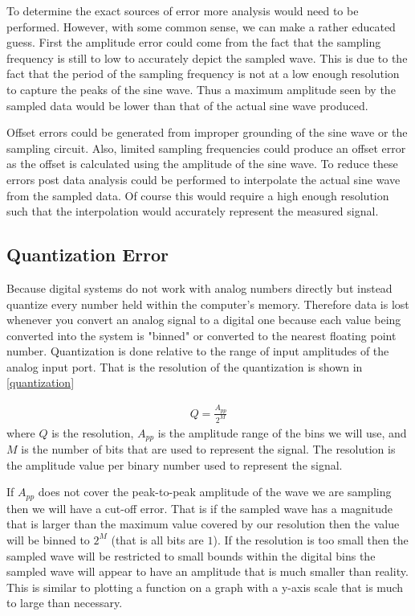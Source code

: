 \documentclass[main.tex]{subfile}
\begin{document}
To determine the exact sources of error more analysis would need to be
performed. However, with some common sense, we can make a rather educated guess.
First the amplitude error could come from the fact that the sampling frequency
is still to low to accurately depict the sampled wave. This is due to the fact
that the period of the sampling frequency is not at a low enough resolution to
capture the peaks of the sine wave. Thus a maximum amplitude seen by the sampled
data would be lower than that of the actual sine wave produced. 

Offset errors could be generated from improper grounding of the sine wave or the
sampling circuit. Also, limited sampling frequencies could produce an offset
error as the offset is calculated using the amplitude of the sine wave. To
reduce these errors post data analysis could be performed to interpolate the
actual sine wave from the sampled data. Of course this would require a high
enough resolution such that the interpolation would accurately represent the
measured signal.

\subsection{Quantization Error}
\label{sec:quantization_error}

Because digital systems do not work with analog numbers directly but instead
quantize every number held within the computer's memory. Therefore data is lost
whenever you convert an analog signal to a digital one because each value being
converted into the system is "binned" or converted to the nearest floating point
number. Quantization is done relative to the range of input amplitudes of the
analog input port. That is the resolution of the quantization is shown in
\eqref{quantization}

\begin{align}
	Q = \frac{A_{pp}}{2^M}\label{quantization}
\end{align}
where $Q$ is the resolution, $A_{pp}$ is the amplitude range of the bins we will
use, and $M$ is the number of bits that are used to represent the signal. The
resolution is the amplitude value per binary number used to represent the
signal.

If $A_{pp}$ does not cover the peak-to-peak amplitude of the wave we are
sampling then we will have a cut-off error. That is if the sampled wave has a
magnitude that is larger than the maximum value covered by our resolution then
the value will be binned to $2^M$ (that is all bits are $1$). If the resolution
is too small then the sampled wave will be restricted to small bounds within the
digital bins the sampled wave will appear to have an amplitude that is much
smaller than reality. This is similar to plotting a function on a graph with a
y-axis scale that is much to large than necessary.
\end{document}
